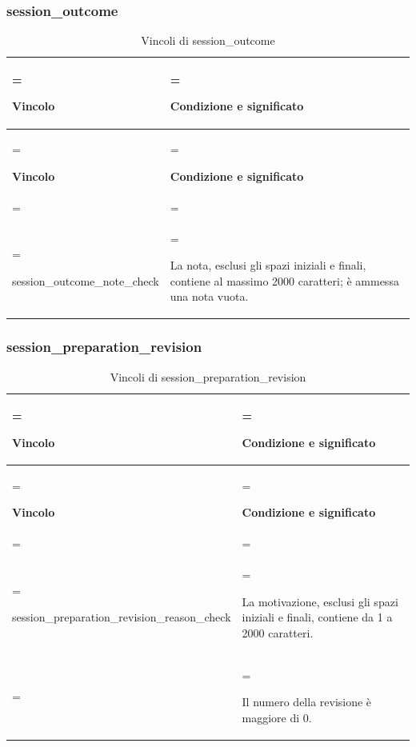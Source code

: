 \documentclass[11pt,a4paper]{article}
\begin{document}
\subsubsection{session\_outcome}
{\small\renewcommand{\arraystretch}{1.25}
\begin{xltabular}{\linewidth}{>{\hsize\linewidth=\hsize\raggedright\arraybackslash}X>{\hsize\linewidth=\hsize\raggedright\arraybackslash}X}
\caption{Vincoli di session\_outcome}\label{tab:dictionary-43}\\
\toprule
\textbf{Vincolo} & \textbf{Condizione e significato}\\\midrule\endfirsthead\toprule\textbf{Vincolo} & \textbf{Condizione e significato}\\\midrule\endhead
\midrule{}\\\endfoot\bottomrule\endlastfoot

{\ttfamily\small session\_\allowbreak{}outcome\_\allowbreak{}note\_\allowbreak{}check} & La nota, esclusi gli spazi iniziali e finali, contiene al massimo 2000 caratteri; è ammessa una nota vuota.\\*
\end{xltabular}}

\subsubsection{session\_preparation\_revision}
{\small\renewcommand{\arraystretch}{1.25}
\begin{xltabular}{\linewidth}{>{\hsize\linewidth=\hsize\raggedright\arraybackslash}X>{\hsize\linewidth=\hsize\raggedright\arraybackslash}X}
\caption{Vincoli di session\_preparation\_revision}\label{tab:dictionary-44}\\
\toprule
\textbf{Vincolo} & \textbf{Condizione e significato}\\\midrule\endfirsthead\toprule\textbf{Vincolo} & \textbf{Condizione e significato}\\\midrule\endhead
\midrule{}\\\endfoot\bottomrule\endlastfoot

{\ttfamily\small session\_\allowbreak{}preparation\_\allowbreak{}revision\_\allowbreak{}reason\_\allowbreak{}check} & La motivazione, esclusi gli spazi iniziali e finali, contiene da 1 a 2000 caratteri.\\ & Il numero della revisione è maggiore di 0.\\*
\end{xltabular}}
\end{document}
